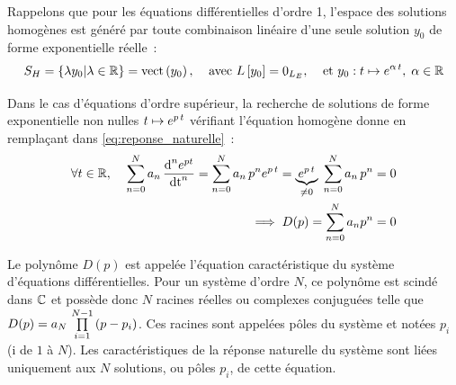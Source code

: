 
      Rappelons que pour les équations différentielles d'ordre 1,
      l'espace des solutions homogènes est généré par toute
      combinaison linéaire d'une seule solution
      $y_0$ de forme exponentielle réelle~:
      \begin{equation}
        \label{eq:sol_homogene_ordre_1}
        S_H=\left\{\lambda y_0|\lambda\in\mathbb{R}\right\}=\mathrm{vect}\left(y_0\right),\;\;\;\; \text{avec } L\left[y_0\right]=\mathrm{0}_{L_E},\;\;\;\; \text{et } y_0: t\mapsto e^{\alpha\,t},\;\alpha \in \mathbb{R} 
      \end{equation}

      Dans le cas d'équations d'ordre supérieur, la recherche de
      solutions de forme exponentielle non nulles
      $t\mapsto e^{p\,t}$ vérifiant l'équation homogène donne en
      remplaçant dans \eqref{eq:reponse_naturelle}~:
      \begin{eqnarray} \label{solution_reponse_naturelle} \forall
        t\in\mathbb{R},\;\;\;\; \sum\limits_{n=0}^N a_{n}\,\frac{\mathrm{d{}}^{n}e^{p
            t}}{{\mathrm{d{t}}}^{n}} =
        \sum\limits_{n=0}^N a_{n}\,p^{n} e^{p\,t} =\underbrace{e^{p\,t}}_{\neq 0}\;\sum\limits_{n=0}^N a_{n}\,p^{n}  =0\\
        \implies D(p)= \sum_{n=0}^N a_{n} p^{n} = 0
      \end{eqnarray}

      Le polynôme $D(p)$ est appelée l'équation caractéristique du
      système d'équations différentielles. Pour un système d'ordre
      $N$, ce polynôme est scindé dans $\mathbb{C}$ et possède donc $N$
      racines réelles ou complexes conjuguées telle que
      $D(p)=a_N\,\prod\limits_{i=1}^{N-1}\left(p-p_i\right)$. Ces racines sont appelées
      pôles du système et notées $p_i$ (i de $1$ à $N$). Les
      caractéristiques de la réponse naturelle du système sont liées
      uniquement aux $N$ solutions, ou pôles $p_{i}$, de cette
      équation.

        
